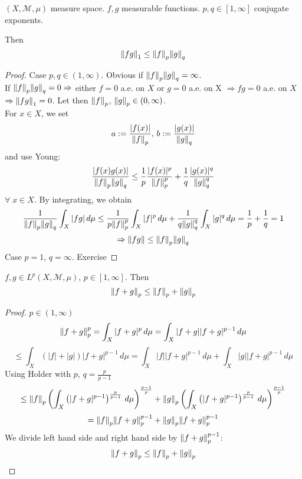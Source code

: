 \begin{theorem}
    \(\left(X, \mathcal{M}, \mu \right)\) measure space. \(f, g\) measurable functions. \(p, q \in [1, \infty]\) conjugate exponents.

    Then 
    \[
        \norm{fg}_1 \leq \norm{f}_p \norm{g}_q
    \]
\end{theorem}
\begin{proof}
    Case \(p, q \in (1, \infty)\). Obvious if \(\norm{f}_p \norm{g}_q = \infty\). \\
    If \(\norm{f}_p \norm{g}_q = 0 \Rightarrow\)  either \(f=0\) a.e. on \(X\) or \(g=0\) a.e. on X
    \(\Rightarrow fg=0\) a.e. on \(X\) \(\Rightarrow \norm{fg}_1 =0\). Let then \(\norm{f}_p\), \(\norm{g}_p \in (0, \infty)\). \\
    For \(x \in X\), we set 
    \[
        a := \frac{|f(x)|}{\norm{f}_p} \text{, } b := \frac{|g(x)|}{\norm{g}_q} 
    \]
    and use Young:
    \[
        \frac{|f(x)g(x)|}{\norm{f}_p \norm{g}_q} 
        \leq \frac{1}{p} \frac{|f(x)|^p}{\norm{f}_p^p} + \frac{1}{q} \frac{|g(x)|^q}{\norm{g}_q^q}
    \]
    \(\forall \; x \in X \). By integrating, we obtain
    \[
        \frac{1}{\norm{f}_p \norm{g}_q} \int_X |fg| \, d\mu \leq 
        \frac{1}{p \norm{f}_p^p} \int_X |f|^p \, d\mu + \frac{1}{q \norm{g}_q^q} \int_X |g|^q \, d\mu 
        = \frac{1}{p} + \frac{1}{q} = 1
    \]
    \[
        \Rightarrow \norm{fg} \leq \norm{f}_p \norm{g}_q
    \]
    Case \(p=1\), \(q= \infty\). Exercise 
\end{proof}
\begin{theorem}
    \(f, g \in L^p(X, \mathcal{M}, \mu)\), \(p \in [1, \infty]\). Then 
    \[
        \norm{f+g}_p \leq \norm{f}_p + \norm{g}_p
    \] 
\end{theorem}
\begin{proof}
    \(p \in (1, \infty)\)
    \[
        \norm{f+g}_p^p = \int_X |f+g|^p \, d\mu = \int_X |f+g| |f+g|^{p-1} \, d\mu
    \]
    \[    
        \leq \int_X \left( |f|+|g| \right) |f+g|^{p-1} \, d\mu
        = \int_X |f| |f+g|^{p-1} \, d\mu + \int_X |g| |f+g|^{p-1} \, d\mu 
    \]
    Using Holder with \(p\), \(q = \frac{p}{p-1}\)
    \[
        \leq \norm{f}_p \left( \int_X \left( |f+g|^{p-1} \right)^{\frac{p}{p-1}} \, d\mu \right) ^ {\frac{p-1}{p}}
        + \norm{g}_p \left( \int_X \left( |f+g|^{p-1} \right)^{\frac{p}{p-1}} \, d\mu \right) ^ {\frac{p-1}{p}}
    \]
    \[
        = \norm{f}_p \norm{f+g}^{p-1}_p + \norm{g}_p \norm{f+g}_p^{p-1}
    \]
    We divide left hand side and right hand side by \(\norm{f+g}_p^{p-1}\):
    \[
        \norm{f+g}_p \leq \norm{f}_p + \norm{g}_p
    \]
\end{proof}